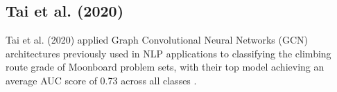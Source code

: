 \documentclass[10pt]{article}
\begin{document}
\subsection{Tai et al. (2020)}
Tai et al. (2020) applied Graph Convolutional Neural Networks (GCN)
architectures previously used in NLP applications to classifying the climbing
route grade of Moonboard problem sets, with their top model achieving an
average AUC score of 0.73 across all classes \cite{tai_wu_hinojosa_2020}.


\end{document}
